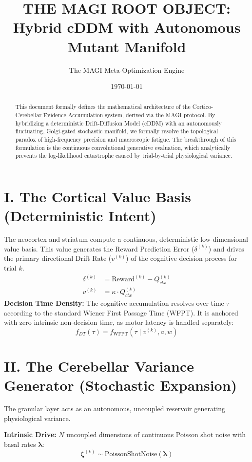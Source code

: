 \documentclass[11pt, a4paper]{article}
\title{\textbf{THE MAGI ROOT OBJECT:}\\ Hybrid cDDM with Autonomous Mutant Manifold}
\author{The MAGI Meta-Optimization Engine}
\date{\today}
\begin{document}
\maketitle

\begin{abstract}
This document formally defines the mathematical architecture of the Cortico-Cerebellar Evidence Accumulation system, derived via the MAGI protocol. By hybridizing a deterministic Drift-Diffusion Model (cDDM) with an autonomously fluctuating, Golgi-gated stochastic manifold, we formally resolve the topological paradox of high-frequency precision and macroscopic fatigue. The breakthrough of this formulation is the continuous convolutional generative evaluation, which analytically prevents the log-likelihood catastrophe caused by trial-by-trial physiological variance.
\end{abstract}

\section{I. The Cortical Value Basis (Deterministic Intent)}
The neocortex and striatum compute a continuous, deterministic low-dimensional value basis. This value generates the Reward Prediction Error ($\delta^{(k)}$) and drives the primary directional Drift Rate ($v^{(k)}$) of the cognitive decision process for trial $k$.
\begin{align}
\delta^{(k)} &= \text{Reward}^{(k)} - Q_{ctx}^{(k)} \\
v^{(k)} &= \kappa \cdot Q_{ctx}^{(k)}
\end{align}
\textbf{Decision Time Density:} The cognitive accumulation resolves over time $\tau$ according to the standard Wiener First Passage Time (WFPT). It is anchored with zero intrinsic non-decision time, as motor latency is handled separately:
\begin{equation}
f_{DT}(\tau) = f_{\text{WFPT}}(\tau \mid v^{(k)}, a, w)
\end{equation}

\section{II. The Cerebellar Variance Generator (Stochastic Expansion)}
The granular layer acts as an autonomous, uncoupled reservoir generating physiological variance.

\textbf{Intrinsic Drive:} $N$ uncoupled dimensions of continuous Poisson shot noise with basal rates $\mathbf{\lambda}$:
\begin{equation}
\mathbf{\zeta}^{(k)} \sim \text{PoissonShotNoise}(\mathbf{\lambda})
\end{equation}
\end{document}
